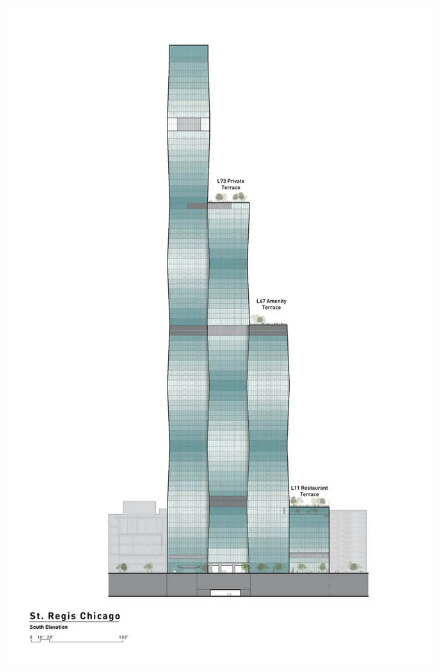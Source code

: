 \begin{figure}
\begin{minipage}{0.3\textwidth}
 \includegraphics[width=\textwidth]{Graphics/Images/image_8.jpg}
 \caption{ }
 \label{fig:8}
\end{minipage}
\begin{minipage}{0.3\textwidth}

\end{minipage}
\end{figure}
